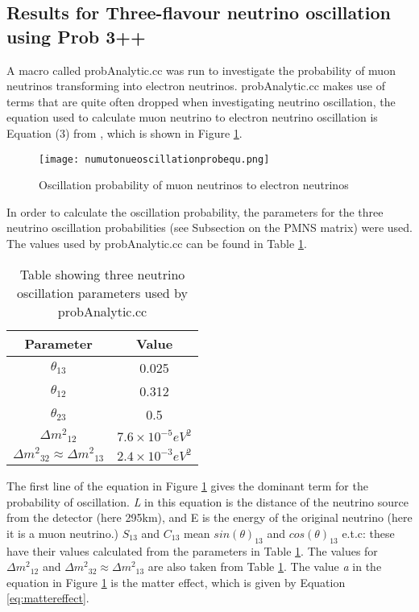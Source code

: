 \documentclass[11pt,oneside,a4paper]{article}
\begin{document}
\subsection{Results for Three-flavour neutrino oscillation using Prob 3++}
A macro called probAnalytic.cc was run to investigate the probability of muon neutrinos transforming into electron neutrinos. probAnalytic.cc makes use of terms that are quite often dropped when investigating neutrino oscillation, the equation used to calculate muon neutrino to electron neutrino oscillation is Equation (3) from \cite{probcomponents}, which is shown in Figure \ref{fig:probosc}.

	\begin{figure}
	\centering
	\captionsetup{justification=centering}
	\texttt{[image: numutonueoscillationprobequ.png]}
	\caption{Oscillation probability of muon neutrinos to electron neutrinos}
	\label{fig:probosc}
\end{figure}


In order to calculate the oscillation probability, the parameters for the three neutrino oscillation probabilities (see Subsection on the PMNS matrix) were used. The values used by probAnalytic.cc can be found in Table \ref{table:probpara}. 


	\begin{table}[h!]
	\centering
	\begin{tabular}{||c c||} 
		\hline
		Parameter & Value \\ [0.5ex] 
		\hline\hline
		$\theta_{13}$ & 0.025  \\ 
		\hline
		$\theta_{12}$ & 0.312  \\
		\hline
		$\theta_{23}$ & 0.5 \\
		\hline
		$\Delta{m^2}_{12}$ & $7.6 \times 10^{{-}5} eV^2$ \\
		\hline
		 $\Delta{m^2}_{32} \approx \Delta{m^2}_{13}$ & $2.4 \times 10^{{-}3} eV^2$  \\ [1ex] 
		\hline
	\end{tabular}
	\captionsetup{justification=centering}
	\caption{Table showing three neutrino oscillation parameters used by probAnalytic.cc}
\label{table:probpara}
\end{table}

The first line of the equation in Figure \ref{fig:probosc} gives the dominant term for the probability of oscillation. \textit{L} in this equation is the distance of the neutrino source from the detector (here 295km), and E is the energy of the original neutrino (here it is a muon neutrino.) $S_{13}$ and $C_{13}$ mean $sin(\theta)_{13}$ and $cos(\theta)_{13}$ e.t.c: these have their values calculated from the parameters in Table \ref{table:probpara}. The values for $\Delta{m^2}_{12}$ and $\Delta{m^2}_{32} \approx \Delta{m^2}_{13}$ are also taken from Table \ref{table:probpara}. The value \textit{a} in the equation in Figure \ref{fig:probosc} is the matter effect, which is given by Equation \ref{eq:mattereffect}.
\end{document}
